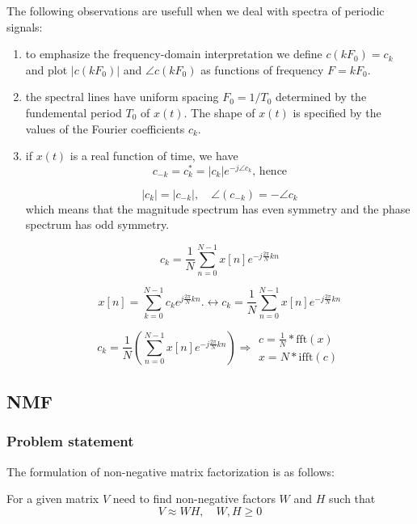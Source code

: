 \documentclass[oneside, final, 14pt]{extarticle}
\begin{document}
The following observations are usefull when we deal with spectra of
periodic signals:
\begin{enumerate}
\item to emphasize the frequency-domain interpretation we define
$c(kF_0) = c_k$ and plot $|c(kF_0)|$ and $\angle c(kF_0)$ as functions
of frequency $F = kF_0$.

\item the spectral lines have uniform spacing $F_0 = 1 / T_0$
determined by the fundemental period $T_0$ of $x(t)$.
The shape of $x(t)$ is specified by the values of the Fourier
coefficients $c_k$.

\item if $x(t)$ is a real function of time, we have
\[
  c_{-k} = c_k^* = |c_k| e^{-j\angle c_k} \text{, hence}
\]

\[
  |c_k| = |c_{-k}|, \quad \angle (c_{-k}) = -\angle c_k
\]
which means that the magnitude spectrum has even symmetry
and the phase spectrum has odd symmetry.

\[
  c_k = \frac{1}{N} \sum_{n=0}^{N-1} x[n] e^{-j\frac{2\pi}{N}kn}
\]


\[
  x[n] = \sum_{k=0}^{N-1} c_k e^{j\frac{2\pi}{N}kn}.
	\leftrightarrow
  c_k = \frac{1}{N} \sum_{n=0}^{N-1} x[n] e^{-j\frac{2\pi}{N}kn}
\]

\[
  c_k = \frac{1}{N} \left(\sum_{n=0}^{N-1} x[n] e^{-j\frac{2\pi}{N}kn}\right)
  \Rightarrow
  \begin{aligned}
    c = \frac{1}{N} * \text{fft}(x) \\
    x = N * \text{ifft}(c)
  \end{aligned}
\]



\end{enumerate}

\subsection{NMF}

\subsubsection{Problem statement}

The formulation of non-negative matrix factorization is as follows:

For a given matrix $V$ need to find non-negative factors $W$ and $H$
such that
\[
  V \approx WH, \quad W,H \geqslant 0
\]
\end{document}
